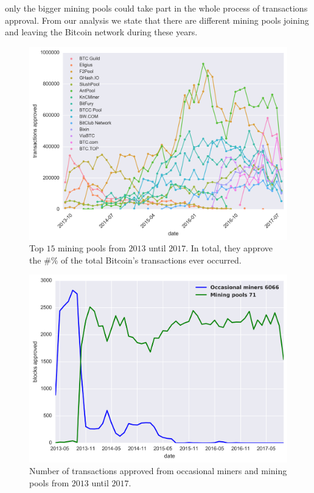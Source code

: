 \documentclass[USenglish]{uit-thesis}
\begin{document}
only the bigger mining pools could take part in the whole
process of transactions approval.
From our analysis we state that there are different mining pools
joining and leaving the Bitcoin network during these years.
\begin{figure}[h]
	\centering
	\includegraphics[width=1\linewidth]{img/trendy_miners}
	\caption{Top $15$ mining pools from $2013$ until $2017$. In total, they approve the $\#\%$
	of the total Bitcoin's transactions ever occurred.}
	\label{fig:trendy_miners}
\end{figure}
\begin{figure}[h]
	\centering
	\includegraphics[width=1\textwidth]{img/top_miners_monthly}
	\caption{Number of transactions approved from occasional miners and mining pools from $2013$ until $2017$.}
	\label{fig:top_miners_monthly}
\end{figure}
\end{document}
